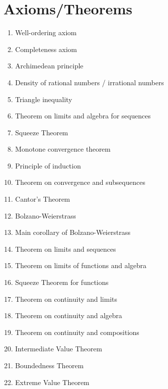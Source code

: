 \documentclass[12pt]{amsart}
\begin{document}
\section*{Axioms/Theorems}

\begin{enumerate}
	\item Well-ordering axiom
	\item Completeness axiom
	\item Archimedean principle
	\item Density of rational numbers / irrational numbers


	\item Triangle inequality

	\item Theorem on limits and algebra for sequences

	\item Squeeze Theorem
	\item Monotone convergence theorem
		\item Principle of induction
				
	\item Theorem on convergence and subsequences


	\item Cantor's Theorem
	


	\item Bolzano-Weierstrass

	\item Main corollary of Bolzano-Weierstrass


	\item Theorem on limits and sequences
	\item Theorem on limits of functions and algebra
	\item Squeeze Theorem for functions


	\item Theorem on continuity and limits
	
	\item Theorem on continuity and algebra
	\item Theorem on continuity and compositions
							\item Intermediate Value Theorem
	\item Boundedness Theorem
	\item Extreme Value Theorem
	
	\begin{comment}	

	\item Derivatives and algebra 
		\item Derivatives and minima/maxima
	\item Mean Value Theorem
	\item Increasing/decreasing functions and derivatives
\end{comment}
\end{enumerate}
\end{document}
